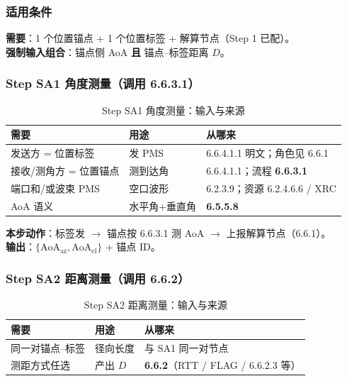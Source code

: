 \documentclass[11pt,a4paper]{ctexart}
\begin{document}
\label{sec:sa}

\subsubsection{适用条件}

\textbf{需要}：1 个位置锚点 + 1 个位置标签 + 解算节点（Step 1 已配）。\\
\textbf{强制输入组合}：锚点侧 AoA \textbf{且} 锚点--标签距离 $D$。

\subsubsection{Step SA1 角度测量（调用 6.6.3.1）}

\begin{longtable}{L{3.4cm}L{4.8cm}L{4.8cm}}
\caption{Step SA1 角度测量：输入与来源\label{tab:step123}} \\
\toprule
\textbf{需要} & \textbf{用途} & \textbf{从哪来} \\
\midrule
发送方 = 位置标签 & 发 PMS & 6.6.4.1.1 明文；角色见 6.6.1 \\
接收/测角方 = 位置锚点 & 测到达角 & 6.6.4.1.1；流程 \textbf{6.6.3.1} \\
端口和/或波束 PMS & 空口波形 & 6.2.3.9；资源 6.2.4.6.6 / XRC \\
AoA 语义 & 水平角+垂直角 & \textbf{6.5.5.8} \\
\bottomrule
\end{longtable}

\textbf{本步动作}：标签发 $\rightarrow$ 锚点按 6.6.3.1 测 AoA $\rightarrow$ 上报解算节点（6.6.1）。\\
\textbf{输出}：$\{\mathrm{AoA}_{\mathrm{az}},\mathrm{AoA}_{\mathrm{el}}\}$ + 锚点 ID。

\subsubsection{Step SA2 距离测量（调用 6.6.2）}

\begin{longtable}{L{3.4cm}L{4.8cm}L{4.8cm}}
\caption{Step SA2 距离测量：输入与来源\label{tab:step124}} \\
\toprule
\textbf{需要} & \textbf{用途} & \textbf{从哪来} \\
\midrule
同一对锚点--标签 & 径向长度 & 与 SA1 同一对节点 \\
测距方式任选 & 产出 $D$ & \textbf{6.6.2}（RTT / FLAG / 6.6.2.3 等） \\
\bottomrule
\end{longtable}
\end{document}
